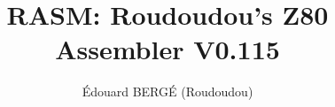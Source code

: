 \usepackage[space]{grffile}
\usepackage{enumitem}
\usepackage{tabularx}

\usepackage[hidelinks]{hyperref}
\usepackage[margin=3cm]{geometry}

\usepackage{makeidx}
\usepackage[table]{xcolor}
\usepackage{framed}
\usepackage{multicol}

\renewenvironment{leftbar}{\def\FrameCommand{\vrule width 0.5pt \hspace{8pt}}\MakeFramed {\advance\hsize-\width \FrameRestore}}{\endMakeFramed}

\newenvironment{code}
{
\begin{leftbar}
\begin{ttfamily}
\bgroup\obeylines
}
{
\egroup
\end{ttfamily}
\end{leftbar}
}


\usepackage{fancyhdr}
\pagestyle{fancy}

\fancyhead[L]{}
\fancyhead[R]{}
\setlength{\parindent}{0pt}

\title{RASM: Roudoudou's Z80 Assembler V0.115}

\author{\'Edouard BERG\'E (Roudoudou)}
\makeindex


\maketitle
\tableofcontents











\appendix








